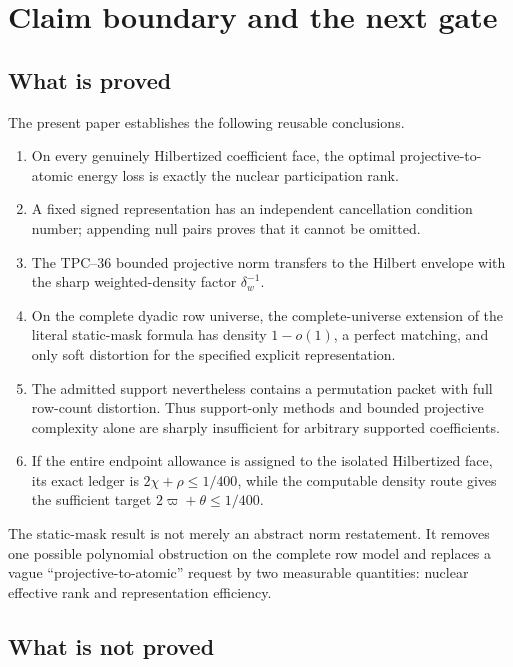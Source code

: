 \section{Claim boundary and the next gate}
\label{sec:tpc49-boundaries}

\subsection{What is proved}

The present paper establishes the following reusable conclusions.
\begin{enumerate}[label=\textup{(\roman*)},leftmargin=2.4em]
 \item On every genuinely Hilbertized coefficient face, the optimal
       projective-to-atomic energy loss is exactly the nuclear
       participation rank.
 \item A fixed signed representation has an independent cancellation
       condition number; appending null pairs proves that it cannot be
       omitted.
 \item The TPC--36 bounded projective norm transfers to the Hilbert
       envelope with the sharp weighted-density factor
       \(\delta_w^{-1}\).
 \item On the complete dyadic row universe, the complete-universe
       extension of the literal static-mask formula has density
       \(1-o(1)\), a perfect matching, and only soft distortion for the
       specified explicit representation.
 \item The admitted support nevertheless contains a permutation packet
       with full row-count distortion.  Thus support-only methods and
       bounded projective complexity alone are sharply insufficient for
       arbitrary supported coefficients.
 \item If the entire endpoint allowance is assigned to the isolated
       Hilbertized face, its exact ledger is
       \(2\chi+\rho\le1/400\), while the computable density route gives
       the sufficient target
       \(2\varpi+\theta\le1/400\).
\end{enumerate}

The static-mask result is not merely an abstract norm restatement.  It
removes one possible polynomial obstruction on the complete row model
and replaces a vague ``projective-to-atomic'' request by two measurable
quantities: nuclear effective rank and representation efficiency.

\subsection{What is not proved}

